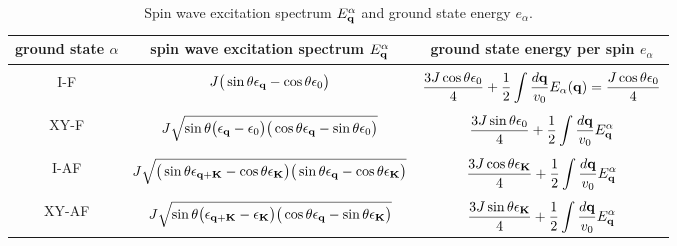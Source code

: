 \begin{table*}[t]
\begin{tabular}{c c  c}
\toprule
 ground state $\alpha$&  \hspace{30pt}  spin wave excitation spectrum $E^{\alpha}_{\bf q}$   \hspace{30pt} & \hspace{20pt} ground state energy per spin $e_{\alpha}$ \hspace{20pt} \\
 \hline
 \\
I-F& $J \big(\sin \theta  \epsilon_{\bf q} - \cos \theta  \epsilon_{0}\big) $&    $\displaystyle   \frac{3 J \cos \theta \epsilon_{0}}{4}  +\frac{1}{2}  \int \frac{d{\bf q}}{v_0} E_{\alpha}({\bf q})=\frac{J  \cos \theta \epsilon_{0}}{4}$\\
 \\
 XY-F & $    J\sqrt{ \sin\theta \big(\epsilon_{\bf q}-\epsilon_{0}\big)\big( \cos\theta \epsilon_{\bf q}- \sin \theta \epsilon_{0}\big)}$
&$\displaystyle   \frac{3 J \sin \theta \epsilon_{0} }{4}  +\frac{1}{2}  \int \frac{d{\bf q}}{v_0} E^{\alpha}_{\bf q}$\\
\\
 I-AF &  $ J  \sqrt{\big( \sin \theta \epsilon_{{\bf q}+{\bf K}}-\cos \theta \epsilon_{\bf K}\big) \big(\sin \theta \epsilon_{\bf q}- \cos \theta \epsilon_{\bf K }\big)}$
 &$ \displaystyle \frac{3  J \cos \theta \epsilon_{\bf K} }{4}  +\frac{1}{2}  \int \frac{d{\bf q}}{v_0} E^{\alpha}_{\bf q}$\\
 \\
 XY-AF& $  J  \sqrt{\sin \theta \big(  \epsilon_{{\bf q}+{\bf K}}-\epsilon_{\bf K} \big)\big( \cos \theta \epsilon_{\bf q}-\sin \theta \epsilon_{\bf K}\big)}$& 
 $\displaystyle \frac{3 J \sin \theta \epsilon_{\bf K} }{4} + \frac{1}{2}  \int \frac{d{\bf q}}{v_0} E^{\alpha}_{\bf q}$\\ 
\end{tabular}
\caption{ \label{table1} Spin wave excitation spectrum $E_{\bf q}^{\alpha}$ and ground state energy  $e_{\alpha}$.}
\end{table*}



